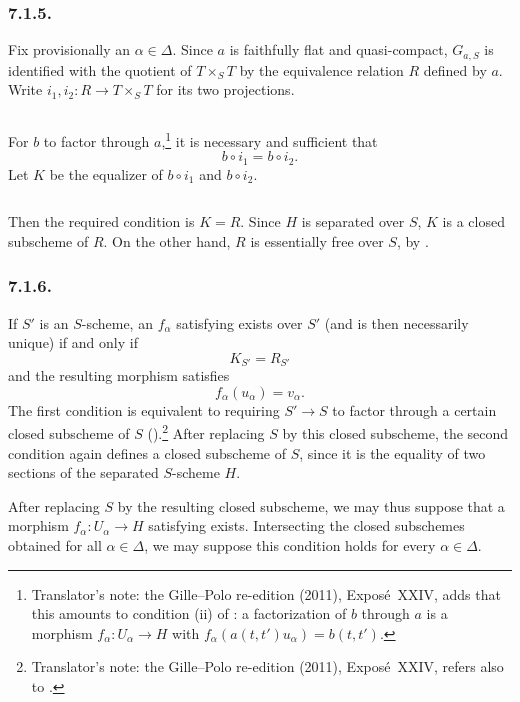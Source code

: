 \subsubsection*{7.1.5.}

Fix provisionally an \(\alpha\in\Delta\). Since \(a\) is faithfully
flat and quasi-compact, \(G_{a,S}\) is identified with the quotient of
\(T\times_S T\) by the equivalence relation \(R\) defined by \(a\).
Write \(i_1,i_2:R\to T\times_S T\) for its two projections.

\[
  
\]

For \(b\) to factor through \(a\),\footnote{Translator's note: the Gille--Polo re-edition (2011), Exposé~XXIV, adds that this amounts to
condition (ii) of : a factorization of \(b\) through \(a\) is a morphism
\(f_\alpha\colon U_\alpha\to H\) with \(f_\alpha(a(t,t')u_\alpha)=b(t,t')\).} it is necessary and
sufficient that
\[
  b\circ i_1=b\circ i_2.
\]
Let \(K\) be the equalizer of \(b\circ i_1\) and \(b\circ i_2\).

\[
  
\]

Then the required condition is \(K=R\). Since \(H\) is separated over
\(S\), \(K\) is a closed subscheme of \(R\). On the other hand,
\(R\) is essentially free over \(S\), by .

\subsubsection*{7.1.6.}

If \(S'\) is an \(S\)-scheme, an \(f_\alpha\) satisfying
 exists over \(S'\) (and is then necessarily unique) if and only if
\[
  K_{S'}=R_{S'}
\]
and the resulting morphism satisfies
\[
  f_\alpha(u_\alpha)=v_\alpha.
\]
The first condition is equivalent to requiring \(S'\to S\) to factor
through a certain closed subscheme of \(S\) ().\footnote{Translator's note: the Gille--Polo re-edition (2011), Exposé~XXIV, refers also to
.} After replacing \(S\) by this closed
subscheme, the second condition again defines a closed subscheme of
\(S\), since it is the equality of two sections of the separated
\(S\)-scheme \(H\).

After replacing \(S\) by the resulting closed subscheme, we may thus
suppose that a morphism \(f_\alpha:U_\alpha\to H\) satisfying 
exists. Intersecting the closed subschemes obtained for all
\(\alpha\in\Delta\), we may suppose this condition holds for every
\(\alpha\in\Delta\).

